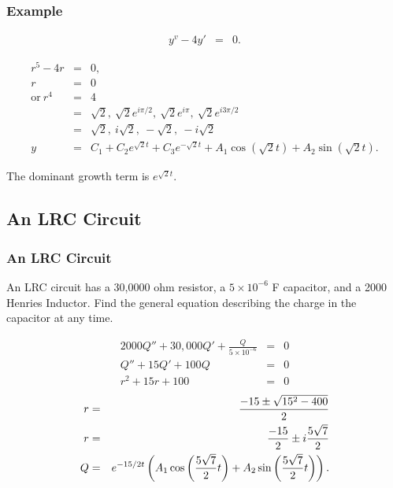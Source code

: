 \begin{frame}
  \frametitle{Example}

  \begin{eqnarray*}
    y^v - 4 y'& = & 0.
  \end{eqnarray*}

  {
    \begin{eqnarray*}
      r^5 - 4r & = & 0, \\
      r & = & 0 \\
      \mathrm{or~} r^4 & = & 4 \\
      & = & \sqrt{2},~\sqrt{2}e^{i \pi/2}, ~ \sqrt{2}e^{i \pi},~ \sqrt{2}e^{i 3\pi/2} \\
      & = & \sqrt{2},~i\sqrt{2},~-\sqrt{2},~-i\sqrt{2} \\
      y & = & C_1 + C_2 e^{\sqrt{2}t} + C_3 e^{-\sqrt{2}t} +
      A_1 \cos(\sqrt{2}t) + A_2 \sin(\sqrt{2}t).
    \end{eqnarray*}
  }

  {
    The dominant growth term is $e^{\sqrt{2}t}$. 
  }

\end{frame}

\subsection{An LRC Circuit}

\begin{frame}
  \frametitle{An LRC Circuit}

  An LRC circuit has a 30,0000 ohm resistor, a $5\times 10^{-6}$ F
  capacitor, and a 2000 Henries Inductor. Find the general equation
  describing  the charge in the capacitor at any time.

  {
    
  }

  {
    \begin{eqnarray*}
      2000 Q'' + 30,000 Q' + \frac{Q}{5\times 10^{-6}} & = & 0 \\
      Q'' + 15 Q' + 100 Q & = & 0 \\
      r^2 + 15 r + 100 & = & 0
    \end{eqnarray*}
    \begin{eqnarray*}
      r & = & \frac{-15\pm\sqrt{15^2-400}}{2} \\
      r & = & \frac{-15}{2} \pm i\frac{5\sqrt{7}}{2} \\
      Q & = & e^{-15/2 t}
      \left( A_1 \cos\left( \frac{5\sqrt{7}}{2} t\right) + A_2 \sin\left( \frac{5\sqrt{7}}{2} t \right) \right).
    \end{eqnarray*}

  }

\end{frame}

